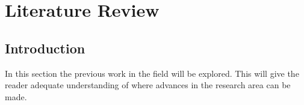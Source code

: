 
\chapter{Literature Review} %

\label{Chapter3} %


\section{Introduction}

In this section the previous work in the field will be explored. This will give the reader adequate understanding of where 
advances in the research area can be made.

